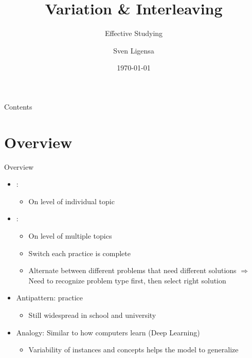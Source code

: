 \documentclass{ercisbeamer}
\title{Variation \& Interleaving}
\subtitle{Effective Studying}
\author{Sven Ligensa}
\institute{European Research Center for Information Systems (ERCIS)}
\date{\today}
\begin{document}
\begin{frame}
    \begin{tbox}
        \titlepage
    \end{tbox}
\end{frame}
\setbgimage{}

\begin{frame}{Contents}
    \tableofcontents
\end{frame}

\section{Overview}
\begin{frame}{Overview}
    \begin{tbox}
        \begin{itemize}
            \item {}: 
            \begin{itemize}
                \item On level of individual topic
            \end{itemize}
            \item {}: 
            \begin{itemize}
                \item On level of multiple topics
                \item Switch  each practice is complete
                \item Alternate between different problems that need different solutions $\Rightarrow$ Need to recognize problem type first, then select right solution
            \end{itemize}
            \item Antipattern:  practice
            \begin{itemize}
                \item Still widespread in school and university
            \end{itemize}
            \item Analogy: Similar to how computers learn (Deep Learning)
            \begin{itemize}
                \item Variability of instances  and concepts  helps the model to generalize
            \end{itemize}
        \end{itemize}
    \end{tbox}
\end{frame}
\setbgimage{}
\end{document}
